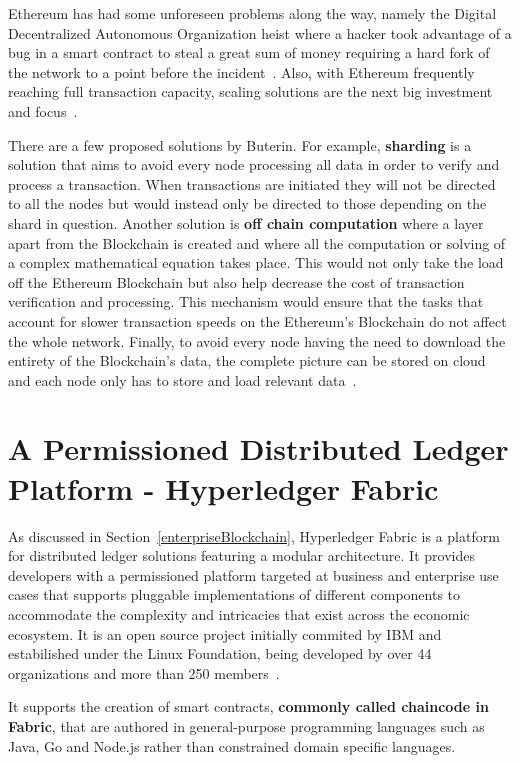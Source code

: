 Ethereum has had some unforeseen problems along the way, namely the Digital
Decentralized Autonomous Organization heist where a hacker took advantage of a
bug in a smart contract to steal a great sum of money requiring a hard fork of
the network to a point before the incident~\cite{Leising2017}. Also, with
Ethereum frequently reaching full transaction capacity, scaling solutions are
the next big investment and focus~\cite{ethereumScalability2018}.

There are a few proposed solutions by Buterin. For example, \textbf{sharding}
is a solution that aims to avoid every node processing all data in order to
verify and process a transaction. When transactions are initiated they will not
be directed to all the nodes but would instead only be directed to those
depending on the shard in question.  Another solution is \textbf{off chain
computation} where a layer apart from the Blockchain is created and where all
the computation or solving of a complex mathematical equation takes place. This
would not only take the load off the Ethereum Blockchain but also help decrease
the cost of transaction verification and processing. This mechanism would
ensure that the tasks that account for slower transaction speeds on the
Ethereum’s Blockchain do not affect the whole network. Finally, to avoid every
node having the need to download the entirety of the Blockchain's data, the
complete picture can be stored on cloud and each node only has to store and
load relevant data~\cite{ethereumBlogScalability2018}.

\section{A Permissioned Distributed Ledger Platform - Hyperledger Fabric}
\label{distributedLedgerPlatform}

As discussed in Section~\ref{enterpriseBlockchain}, Hyperledger Fabric is a
platform for distributed ledger solutions featuring a modular architecture. It
provides developers with a permissioned platform targeted at business and
enterprise use cases that supports pluggable implementations of different
components to accommodate the complexity and intricacies that exist across the
economic ecosystem. It is an open source project initially commited by IBM  and
estabilished under the Linux Foundation, being developed by over 44
organizations and more than 250
members~\cite{HyperledgerFabricDocs2017,HyperledgerGrowth2018}.

It supports the creation of smart contracts, \textbf{commonly called chaincode
in Fabric}, that are authored in general-purpose programming languages such as
Java, Go and Node.js rather than constrained domain specific languages. 

